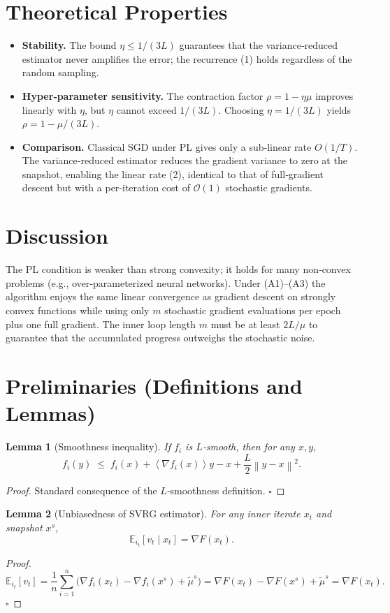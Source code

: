 \documentclass{article}
\newtheorem{lemma}{Lemma}
\newcommand{\E}{\mathbb{E}}
\newcommand{\norm}[1]{\left\lVert #1\right\rVert}
\newcommand{\inner}[1]{\left\langle #1\right\rangle}
\newcommand{\grad}{\nabla}
\begin{document}
\section*{Theoretical Properties}
\begin{itemize}
\item \textbf{Stability.} The bound $\eta\le 1/(3L)$ guarantees that the
variance‑reduced estimator never amplifies the error; the recurrence (1)
holds regardless of the random sampling.
\item \textbf{Hyper‑parameter sensitivity.} The contraction factor
$\rho=1-\eta\mu$ improves linearly with $\eta$, but $\eta$ cannot exceed
$1/(3L)$. Choosing $\eta=1/(3L)$ yields $\rho=1-\mu/(3L)$.
\item \textbf{Comparison.} Classical SGD under PL gives only a
sub‑linear rate $O(1/T)$. The variance‑reduced estimator reduces the
gradient variance to zero at the snapshot, enabling the linear rate
(2), identical to that of full‑gradient descent but with a per‑iteration
cost of $\mathcal O(1)$ stochastic gradients.
\end{itemize}

\section*{Discussion}
The PL condition is weaker than strong convexity; it holds for many
non‑convex problems (e.g., over‑parameterized neural networks).  Under
(A1)–(A3) the algorithm enjoys the same linear convergence as gradient
descent on strongly convex functions while using only $m$ stochastic
gradient evaluations per epoch plus one full gradient.  The inner loop
length $m$ must be at least $2L/\mu$ to guarantee that the accumulated
progress outweighs the stochastic noise.

\newpage
\section*{Preliminaries (Definitions and Lemmas)}
\begin{lemma}[Smoothness inequality]\label{lem:smooth}
If $f_i$ is $L$‑smooth, then for any $x,y$,
\[
f_i(y)\;\le\;f_i(x)+\inner{\grad f_i(x)}{y-x}
+\frac{L}{2}\norm{y-x}^{2}.
\tag{L1}
\]
\end{lemma}
\begin{proof}
Standard consequence of the $L$‑smoothness definition. \hfill $\square$
\end{proof}

\begin{lemma}[Unbiasedness of SVRG estimator]\label{lem:unbiased}
For any inner iterate $x_t$ and snapshot $x^{s}$,
\[
\E_{i_t}[v_t \mid x_t]=\grad F(x_t).
\tag{L2}
\]
\end{lemma}
\begin{proof}
\[
\E_{i_t}[v_t]=\frac1n\sum_{i=1}^{n}\bigl(\grad f_i(x_t)-\grad f_i(x^{s})
+\widetilde{\mu}^{s}\bigr)
=\grad F(x_t)-\grad F(x^{s})+\widetilde{\mu}^{s}
=\grad F(x_t).
\] \hfill $\square$
\end{proof}
\end{document}
